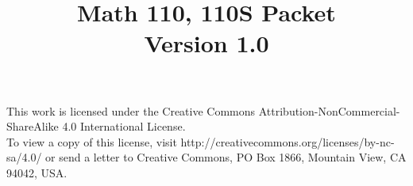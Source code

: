\documentclass[11pt,letterpaper,english]{book}
\begin{document}
\dominitoc

\title{Math 110, 110S Packet\\
Version 1.0}
\date{}

\maketitle
\newpage
\thispagestyle{empty}
\vspace*{\fill}
This work is licensed under the Creative Commons Attribution-NonCommercial-ShareAlike 4.0 International License. \\To view a copy of this license, visit http://creativecommons.org/licenses/by-nc-sa/4.0/ or send a letter to Creative Commons, PO Box 1866, Mountain View, CA 94042, USA.
\vspace*{\fill}
\frontmatter
\pagestyle{plain}
\tableofcontents{}
\pagestyle{fancy}
\mainmatter



















\end{document}
